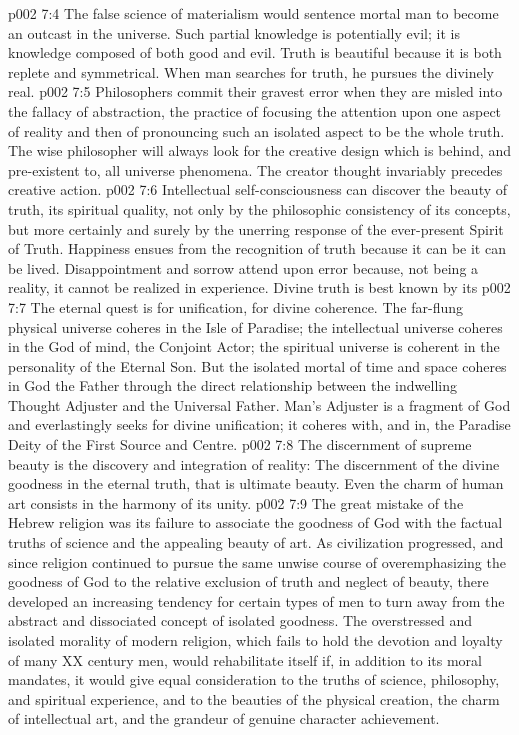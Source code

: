 \vs p002 7:4 \pc The false science of materialism would sentence mortal man to become an outcast in the universe. Such partial knowledge is potentially evil; it is knowledge composed of both good and evil. Truth is beautiful because it is both replete and symmetrical. When man searches for truth, he pursues the divinely real.
\vs p002 7:5 Philosophers commit their gravest error when they are misled into the fallacy of abstraction, the practice of focusing the attention upon one aspect of reality and then of pronouncing such an isolated aspect to be the whole truth. The wise philosopher will always look for the creative design which is behind, and pre\hyp{}existent to, all universe phenomena. The creator thought invariably precedes creative action.
\vs p002 7:6 Intellectual self\hyp{}consciousness can discover the beauty of truth, its spiritual quality, not only by the philosophic consistency of its concepts, but more certainly and surely by the unerring response of the ever\hyp{}present Spirit of Truth. Happiness ensues from the recognition of truth because it can be  it can be lived. Disappointment and sorrow attend upon error because, not being a reality, it cannot be realized in experience. Divine truth is best known by its 
\vs p002 7:7 \pc The eternal quest is for unification, for divine coherence. The far\hyp{}flung physical universe coheres in the Isle of Paradise; the intellectual universe coheres in the God of mind, the Conjoint Actor; the spiritual universe is coherent in the personality of the Eternal Son. But the isolated mortal of time and space coheres in God the Father through the direct relationship between the indwelling Thought Adjuster and the Universal Father. Man’s Adjuster is a fragment of God and everlastingly seeks for divine unification; it coheres with, and in, the Paradise Deity of the First Source and Centre.
\vs p002 7:8 \pc The discernment of supreme beauty is the discovery and integration of reality: The discernment of the divine goodness in the eternal truth, that is ultimate beauty. Even the charm of human art consists in the harmony of its unity.
\vs p002 7:9 The great mistake of the Hebrew religion was its failure to associate the goodness of God with the factual truths of science and the appealing beauty of art. As civilization progressed, and since religion continued to pursue the same unwise course of overemphasizing the goodness of God to the relative exclusion of truth and neglect of beauty, there developed an increasing tendency for certain types of men to turn away from the abstract and dissociated concept of isolated goodness. The overstressed and isolated morality of modern religion, which fails to hold the devotion and loyalty of many XX century men, would rehabilitate itself if, in addition to its moral mandates, it would give equal consideration to the truths of science, philosophy, and spiritual experience, and to the beauties of the physical creation, the charm of intellectual art, and the grandeur of genuine character achievement.
